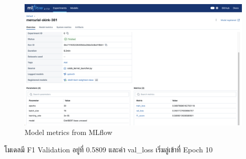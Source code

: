 \begin{figure}[ht]
    \centering
    \includegraphics[width=\imgwidth]
    {images/model_metrics.jpg}
    \caption{Model metrics from MLflow}
    \label{fig:model_metrics.jpg}
\end{figure}

โมเดลมี F1 Validation อยู่ที่ 0.5809 และค่า val\_loss เริ่มลู่เข้าที่ Epoch 10